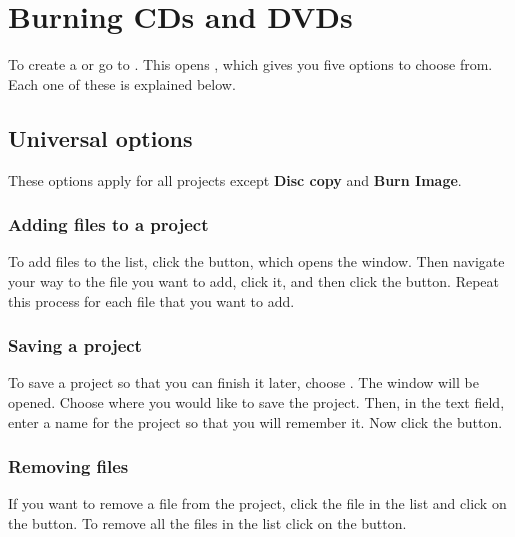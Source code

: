 
\section{Burning CDs and DVDs}

To create a  or  go to . This opens , which
gives you five options to choose from. Each one of these is explained below.


\subsection{Universal options}

These options apply for all projects except \textbf{Disc copy} and \textbf{Burn
Image}.

\subsubsection{Adding files to a project}

To add files to the list, click the  button, which opens the 
window. Then navigate your way to the file you want to add, click it,
and then click the  button. Repeat this process for each file that you 
want to add.

\subsubsection{Saving a project}

To save a project so that you can finish it later, choose . 
The  window will be opened. Choose where you
would like to save the project. Then, in the  text field, enter a name for the 
project so that you will remember it. Now click the  button.

\subsubsection{Removing files}

If you want to remove a file from the project, click the file in the list and click on the  button.
To remove all the files in the list click on the  button.

